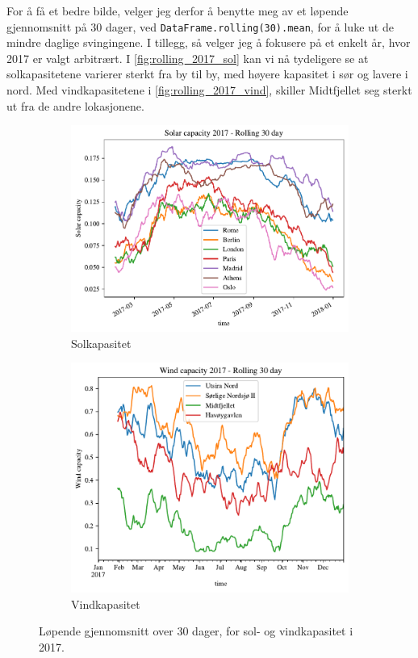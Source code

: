 \documentclass{article}
\begin{document}
For å få et bedre bilde, velger jeg derfor å benytte meg av et løpende gjennomsnitt på 30 dager, ved \verb|DataFrame.rolling(30).mean|, for å luke ut de mindre daglige svingingene.
I tillegg, så velger jeg å fokusere på et enkelt år, hvor 2017 er valgt arbitrært.
I \autoref{fig:rolling_2017_sol} kan vi nå tydeligere se at solkapasitetene varierer sterkt fra by til by, med høyere kapasitet i sør og lavere i nord.
Med vindkapasitetene i \autoref{fig:rolling_2017_vind}, skiller Midtfjellet seg sterkt ut fra de andre lokasjonene.

\begin{figure}[ht]
\centering
\begin{subfigure}{.5\textwidth}
    \centering
    \includegraphics[width=\linewidth]{oblig/figures/Solar/Solar capacity 2017 - Rolling 30 day.pdf}
    \caption{Solkapasitet}
    \label{fig:rolling_2017_sol}
\end{subfigure}%
\begin{subfigure}{.5\textwidth}
    \centering
    \includegraphics[width=\linewidth]{oblig/figures/Wind/Wind capacity 2017 - Rolling 30 day.pdf}
    \caption{Vindkapasitet}
    \label{fig:rolling_2017_vind}
\end{subfigure}
\caption{Løpende gjennomsnitt over 30 dager, for sol- og vindkapasitet i 2017.}
\label{fig:rolling_2017}
\end{figure}
\end{document}
